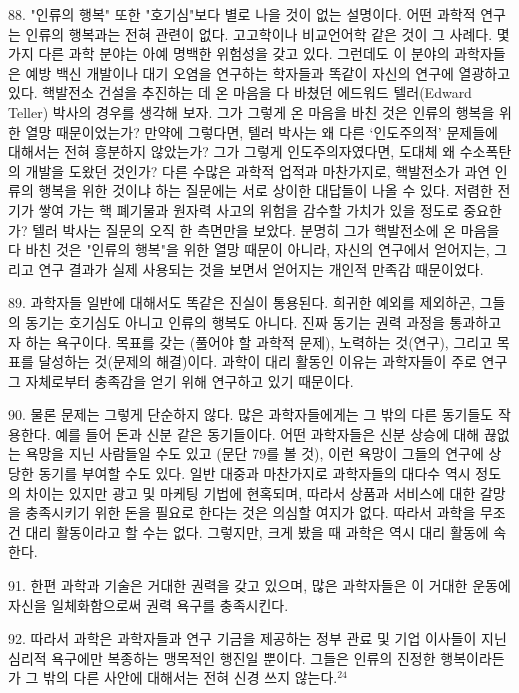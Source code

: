 \documentclass[11pt,a4paper]{article}
\begin{document}
\begin{multicols}{2}
88. "인류의 행복" 또한 "호기심"보다 별로 나을 것이 없는 설명이다. 어떤 과학적 연구는 인류의 행복과는 전혀 관련이 없다. 고고학이나 비교언어학 같은 것이 그 사례다. 몇 가지 다른 과학 분야는 아예 명백한  위험성을 갖고 있다. 그런데도 이 분야의 과학자들은 예방 백신 개발이나 대기 오염을 연구하는 학자들과  똑같이 자신의 연구에 열광하고 있다. 핵발전소 건설을 추진하는 데 온 마음을 다 바쳤던 에드워드 텔러(Edward Teller) 박사의 경우를 생각해 보자. 그가 그렇게 온 마음을 바친 것은 인류의 행복을 위한 열망 때문이었는가? 만약에 그렇다면, 텔러 박사는 왜 다른 `인도주의적' 문제들에 대해서는 전혀 흥분하지  않았는가? 그가 그렇게 인도주의자였다면, 도대체 왜 수소폭탄의 개발을 도왔던 것인가? 다른 수많은  과학적 업적과 마찬가지로, 핵발전소가 과연 인류의 행복을 위한 것이냐 하는 질문에는 서로 상이한  대답들이 나올 수 있다. 저렴한 전기가 쌓여 가는 핵 폐기물과 원자력 사고의 위험을 감수할 가치가 있을  정도로 중요한가? 텔러 박사는 질문의 오직 한 측면만을 보았다. 분명히 그가 핵발전소에 온 마음을 다  바친 것은 "인류의 행복"을 위한 열망 때문이 아니라, 자신의 연구에서 얻어지는, 그리고 연구 결과가 실제 사용되는 것을 보면서 얻어지는 개인적 만족감 때문이었다. 


89. 과학자들 일반에 대해서도 똑같은 진실이 통용된다. 희귀한 예외를 제외하곤, 그들의 동기는  호기심도 아니고 인류의 행복도 아니다. 진짜 동기는 권력 과정을 통과하고자 하는 욕구이다. 목표를 갖는 (풀어야 할 과학적 문제), 노력하는 것(연구), 그리고 목표를 달성하는 것(문제의 해결)이다. 과학이 대리  활동인 이유는 과학자들이 주로 연구 그 자체로부터 충족감을 얻기 위해 연구하고 있기 때문이다. 


90. 물론 문제는 그렇게 단순하지 않다. 많은 과학자들에게는 그 밖의 다른 동기들도 작용한다. 예를 들어 돈과 신분 같은 동기들이다. 어떤 과학자들은 신분 상승에 대해 끊없는 욕망을 지닌 사람들일 수도 있고 (문단 79를 볼 것), 이런 욕망이 그들의 연구에 상당한 동기를 부여할 수도 있다. 일반 대중과 마찬가지로 과학자들의 대다수 역시 정도의 차이는 있지만 광고 및 마케팅 기법에 현혹되며, 따라서 상품과 서비스에 대한 갈망을 충족시키기 위한 돈을 필요로 한다는 것은 의심할 여지가 없다. 따라서 과학을 무조건 대리  활동이라고 할 수는 없다. 그렇지만, 크게 봤을 때 과학은 역시 대리 활동에 속한다. 


91. 한편 과학과 기술은 거대한 권력을 갖고 있으며, 많은 과학자들은 이 거대한 운동에 자신을  일체화함으로써 권력 욕구를 충족시킨다. 


92. 따라서 과학은 과학자들과 연구 기금을 제공하는 정부 관료 및 기업 이사들이 지닌 심리적 욕구에만  복종하는 맹목적인 행진일 뿐이다. 그들은 인류의 진정한 행복이라든가 그 밖의 다른 사안에 대해서는  전혀 신경 쓰지 않는다.\hyperlink{24}{$^{24}$} 



\end{multicols}
\end{document}
